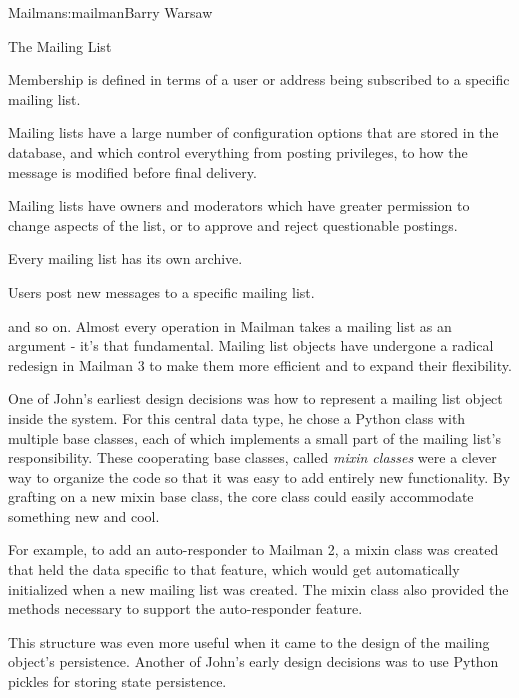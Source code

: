 \begin{aosachapter}{Mailman}{s:mailman}{Barry Warsaw}
\begin{aosasect1}{The Mailing List}
\begin{aosaitemize}

\item Membership is defined in terms of a user or address being
  subscribed to a specific mailing list.

\item Mailing lists have a large number of configuration options that
  are stored in the database, and which control everything from
  posting privileges, to how the message is modified before final
  delivery.

\item Mailing lists have owners and moderators which have greater
  permission to change aspects of the list, or to approve and reject
  questionable postings.

\item Every mailing list has its own archive.

\item Users post new messages to a specific mailing list.

\end{aosaitemize}

\noindent
and so on.  Almost every operation in Mailman takes a mailing list as
an argument - it's that fundamental.  Mailing list objects have
undergone a radical redesign in Mailman 3 to make them more efficient
and to expand their flexibility.

One of John's earliest design decisions was how to represent a mailing
list object inside the system.  For this central data type, he chose a
Python class with multiple base classes, each of which implements a
small part of the mailing list's responsibility.  These cooperating
base classes, called \emph{mixin classes} were a clever way to
organize the code so that it was easy to add entirely new
functionality.  By grafting on a new mixin base class, the core
 class could easily accommodate something new and cool.

For example, to add an auto-responder to Mailman 2, a mixin class was
created that held the data specific to that feature, which would get
automatically initialized when a new mailing list was created.  The
mixin class also provided the methods necessary to support the
auto-responder feature.

This structure was even more useful when it came to the design of the
mailing  object's persistence.  Another of John's early
design decisions was to use Python pickles for storing
state persistence.


\end{aosasect1}
\end{aosachapter}
